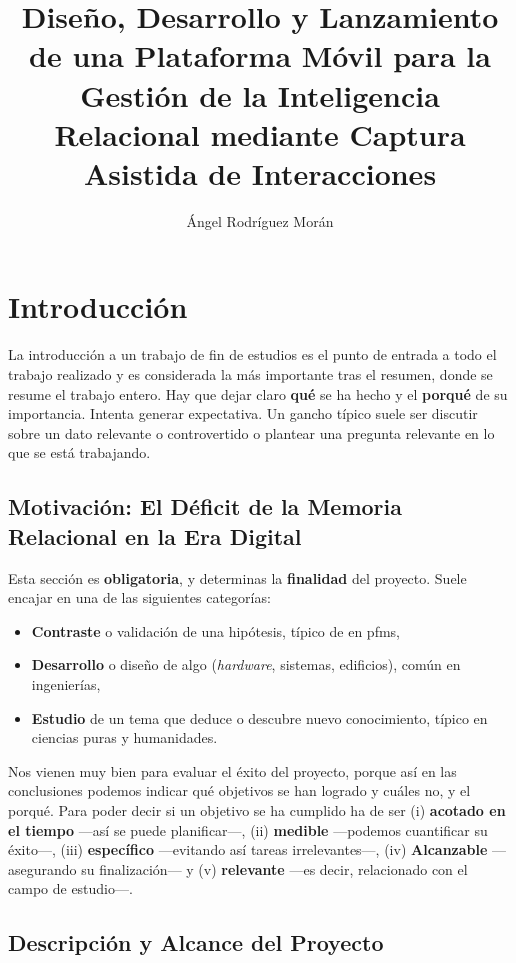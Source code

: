 \documentclass[%
    school=etsisi,%
    type=pfg,%
    degree=61CI,%
]{upm-report}
\title{Diseño, Desarrollo y Lanzamiento de una Plataforma Móvil para la Gestión de la Inteligencia Relacional mediante Captura Asistida de Interacciones}
\author{Ángel Rodríguez Morán}
\begin{document}
\chapter{Introducción}
\label{ch:introduccion}

La introducción a un trabajo de fin de estudios es el punto de entrada a
todo el trabajo realizado y es considerada la más importante tras el
resumen, donde se resume el trabajo entero. Hay que dejar claro
\textbf{qué} se ha hecho y el \textbf{porqué} de su importancia. Intenta
generar expectativa. Un gancho típico suele ser discutir sobre un dato
relevante o controvertido o plantear una pregunta relevante en lo que se
está trabajando.

\section{Motivación: El Déficit de la Memoria Relacional en la Era Digital}

Esta sección es \textbf{obligatoria}, y determinas la \textbf{finalidad}
del proyecto. Suele encajar en una de las siguientes categorías:

\begin{itemize}
    \item \textbf{Contraste} o validación de una hipótesis, típico de en
        \glspl{pfm},
    \item \textbf{Desarrollo} o diseño de algo (\textit{hardware},
        sistemas, edificios), común en ingenierías,
    \item \textbf{Estudio} de un tema que deduce o descubre nuevo
        conocimiento, típico en ciencias puras y humanidades.
\end{itemize}

Nos vienen muy bien para evaluar el éxito del proyecto, porque así en
las conclusiones podemos indicar qué objetivos se han logrado y cuáles
no, y el porqué. Para poder decir si un objetivo se ha cumplido ha de
ser (i) \textbf{acotado en el tiempo} ---así se puede planificar---,
(ii) \textbf{medible} ---podemos cuantificar su éxito---, (iii)
\textbf{específico} ---evitando así tareas irrelevantes---, (iv)
\textbf{Alcanzable}  ---asegurando su finalización--- y (v)
\textbf{relevante} ---es decir, relacionado con el campo de estudio---.

\section{Descripción y Alcance del Proyecto}
\label{s:motivacion}
\end{document}
